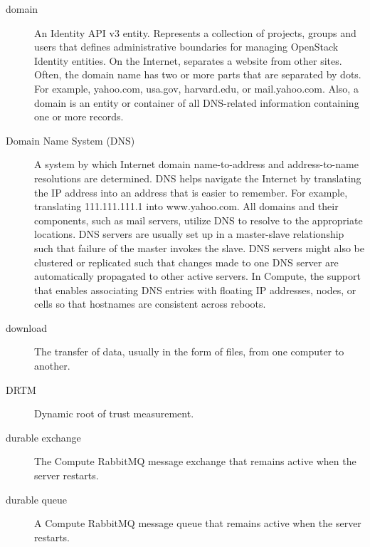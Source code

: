 \documentclass[letterpaper,10pt,english]{sphinxmanual}
\begin{document}
\begin{description}
\item[{domain}] \leavevmode{}\label{_source/glossary:term-domain}
An Identity API v3 entity. Represents a collection of
projects, groups and users that defines administrative boundaries for
managing OpenStack Identity entities.
On the Internet, separates a website from other sites. Often,
the domain name has two or more parts that are separated by dots.
For example, yahoo.com, usa.gov, harvard.edu, or
mail.yahoo.com.
Also, a domain is an entity or container of all DNS-related
information containing one or more records.

\item[{Domain Name System (DNS)}] \leavevmode{}\label{_source/glossary:term-domain-name-system-dns}
A system by which Internet domain name-to-address and
address-to-name resolutions are determined.
DNS helps navigate the Internet by translating the IP address
into an address that is easier to remember. For example, translating
111.111.111.1 into www.yahoo.com.
All domains and their components, such as mail servers, utilize
DNS to resolve to the appropriate locations. DNS servers are usually
set up in a master-slave relationship such that failure of the master
invokes the slave. DNS servers might also be clustered or replicated
such that changes made to one DNS server are automatically propagated
to other active servers.
In Compute, the support that enables associating DNS entries
with floating IP addresses, nodes, or cells so that hostnames are
consistent across reboots.

\item[{download}] \leavevmode{}\label{_source/glossary:term-download}
The transfer of data, usually in the form of files, from one
computer to another.

\item[{DRTM}] \leavevmode{}\label{_source/glossary:term-drtm}
Dynamic root of trust measurement.

\item[{durable exchange}] \leavevmode{}\label{_source/glossary:term-durable-exchange}
The Compute RabbitMQ message exchange that remains active when
the server restarts.

\item[{durable queue}] \leavevmode{}\label{_source/glossary:term-durable-queue}
A Compute RabbitMQ message queue that remains active when the
server restarts.


\end{description}
\end{document}
